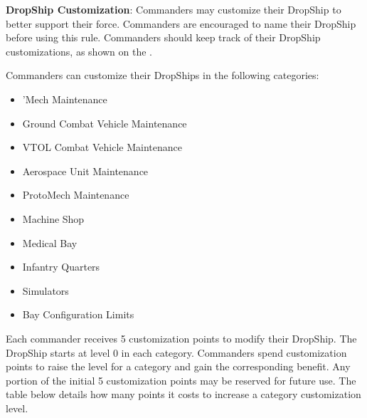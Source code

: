 \item {\bfseries DropShip Customization}: Commanders may customize their DropShip to better support their force.
Commanders are encouraged to name their DropShip before using this rule.
Commanders should keep track of their DropShip customizations, as shown on the .

Commanders can customize their DropShips in the following categories:


\begin{itemize}

\item 'Mech Maintenance

\item Ground Combat Vehicle Maintenance

\item VTOL Combat Vehicle Maintenance

\item Aerospace Unit Maintenance

\item ProtoMech Maintenance

\item Machine Shop

\item Medical Bay

\item Infantry Quarters

\item Simulators

\item Bay Configuration Limits

\end{itemize}


Each commander receives 5 customization points to modify their DropShip.
The DropShip starts at level 0 in each category.
Commanders spend customization points to raise the level for a category and gain the corresponding benefit.
Any portion of the initial 5 customization points may be reserved for future use.
The table below details how many points it costs to increase a category customization level.

